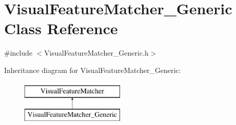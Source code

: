 \hypertarget{class_visual_feature_matcher___generic}{
\section{VisualFeatureMatcher\_\-Generic Class Reference}
\label{class_visual_feature_matcher___generic}
}


{\ttfamily \#include $<$VisualFeatureMatcher\_\-Generic.h$>$}

Inheritance diagram for VisualFeatureMatcher\_\-Generic:\begin{figure}[H]
\begin{center}
\leavevmode
\includegraphics[height=2.000000cm]{class_visual_feature_matcher___generic}
\end{center}
\end{figure}
